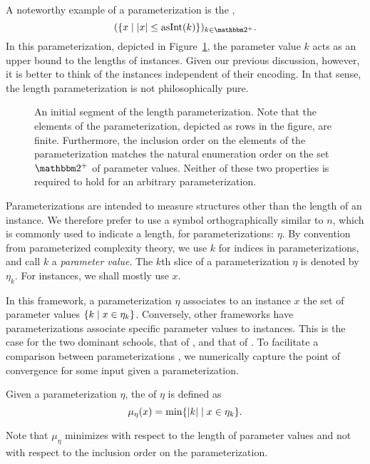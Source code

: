 A noteworthy example of a parameterization is the ,
\begin{equation*}
  (\{x \st \length{x} \le \asNat(k)\})_{k \in \binary^+}.
\end{equation*}
In this parameterization, depicted in Figure~\ref{fig:length_parameterization}, the parameter value $k$ acts as an upper bound to the lengths of instances.
Given our previous discussion, however, it is better to think of the instances independent of their encoding.
In that sense, the length parameterization is not philosophically pure.
\begin{figure}
\caption{
  An initial segment of the length parameterization.
  Note that the elements of the parameterization, depicted as rows in the figure, are finite.
  Furthermore, the inclusion order on the elements of the parameterization matches the natural enumeration order on the set $\binary^+$ of parameter values.
  Neither of these two properties is required to hold for an arbitrary parameterization.
}
\label{fig:length_parameterization}
\end{figure}

Parameterizations are intended to measure structures other than the length of an instance.
We therefore prefer to use a symbol orthographically similar to $n$, which is commonly used to indicate a length, for parameterizations: $\eta$.
By convention from parameterized complexity theory, we use $k$ for indices in parameterizations, and call $k$ a \emph{parameter value}.
The $k$th slice of a parameterization $\eta$ is denoted by $\eta_k$.
For instances, we shall mostly use $x$.

In this framework, a parameterization $\eta$ associates to an instance $x$ the set of parameter values $\{k \;{|}\; x \in \eta_k\}$.
Conversely, other frameworks have parameterizations associate specific parameter values to instances.
This is the case for the two dominant schools, that of \textcite{downey1999parameterized}, and that of \textcite{flum2006parameterized}.
To facilitate a comparison between parameterizations \parencite{komusiewicz2012new}, we numerically capture the point of convergence for some input given a parameterization.
\begin{definition}
  Given a parameterization $\eta$, the  of $\eta$ is defined as
  \begin{equation*}
    \mu_\eta(x) = \min\{{\lvert k\rvert} \;{|}\; x \in \eta_k\}.
  \end{equation*}
\end{definition}
Note that $\mu_\eta$ minimizes with respect to the length of parameter values and not with respect to the inclusion order on the parameterization.

